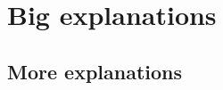 \section{Big explanations}

\lipsum[2-2]\cite{Dinh2015}

\subsection{More explanations}

\lipsum[2-4]\cite{Andrusenko2005}